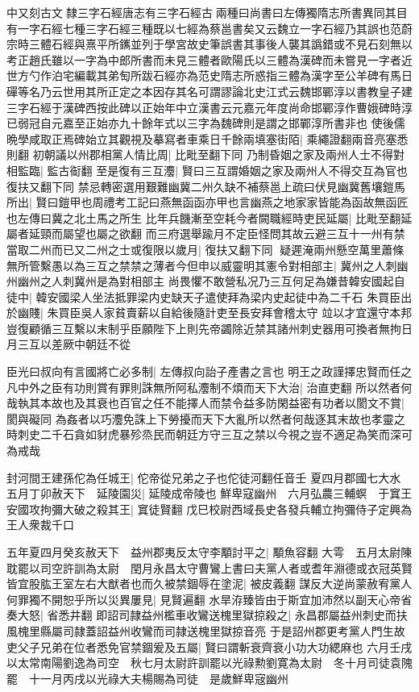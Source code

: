 {中又刻古文隸三字石經唐志有三字石經古兩種曰尚書曰左傳獨隋志所書異同其目有一字石經七種三字石經三種既以七經為蔡邕書矣又云魏立一字石經乃其誤也范蔚宗時三體石經與熹平所䥴並列于學宮故史筆誤書其事後人襲其譌錯或不見石刻無以考正趙氏雖以一字為中郎所書而未見三體者歐陽氏以三體為漢碑而未嘗見一字者近世方勺作泊宅編載其弟匋所跋石經亦為范史隋志所惑指三體為漢字至公羊碑有馬日磾等名乃云世用其所正定之本因存其名可謂謬論北史江式云魏邯鄲淳以書教皇子建三字石經于漢碑西按此碑以正始年中立漢書云元嘉元年度尚命邯鄲淳作曹娥碑時淳已弱冠自元嘉至正始亦九十餘年式以三字為魏碑則是謂之邯鄲淳所書非也}
使後儒晩學咸取正焉碑始立其觀視及摹寫者車乘日千餘兩填塞街陌|{
	乘繩證翻兩音亮塞悉則翻}
初朝議以州郡相黨人情比周|{
	比毗至翻下同}
乃制昏姻之家及兩州人士不得對相監臨|{
	監古䘖翻}
至是復有三互灋|{
	賢曰三互謂婚姻之家及兩州人不得交互為官也復扶又翻下同}
禁忌轉密選用艱難幽冀二州久缺不補蔡邕上疏曰伏見幽冀舊壤鎧馬所出|{
	賢曰鎧甲也周禮考工記曰燕無函函亦甲也言幽燕之地家家皆能為函故無函匠也左傳曰冀之北土馬之所生}
比年兵饑漸至空耗今者闕職經時吏民延屬|{
	比毗至翻延屬者延頸而屬望也屬之欲翻}
而三府選舉踰月不定臣怪問其故云避三互十一州有禁當取二州而已又二州之士或復限以歲月|{
	復扶又翻下同}
疑遲淹兩州懸空萬里蕭條無所管繫愚以為三互之禁禁之薄者今但申以威靈明其憲令對相部主|{
	冀州之人刺幽州幽州之人刺冀州是為對相部主}
尚畏懼不敢營私况乃三互何足為嫌昔韓安國起自徒中|{
	韓安國梁人坐法抵罪梁内史缺天子遣使拜為梁内史起徒中為二千石}
朱買臣出於幽賤|{
	朱買臣吳人家貧賣薪以自給後隨計吏至長安拜會稽太守}
竝以才宜還守本邦豈復顧循三互繫以末制乎臣願陛下上則先帝蠲除近禁其諸州刺史器用可換者無拘日月三互以差厥中朝廷不從

臣光曰叔向有言國將亡必多制|{
	左傳叔向詒子產書之言也}
明王之政謹擇忠賢而任之凡中外之臣有功則賞有罪則誅無所阿私灋制不煩而天下大治|{
	治直吏翻}
所以然者何哉執其本故也及其衰也百官之任不能擇人而禁令益多防閑益密有功者以閡文不賞|{
	閡與礙同}
為姦者以巧灋免誅上下勞擾而天下大亂所以然者何哉逐其末故也孝靈之時刺史二千石貪如豺虎暴殄烝民而朝廷方守三互之禁以今視之豈不適足為笑而深可為戒哉

封河間王建孫佗為任城王|{
	佗帝從兄弟之子也佗徒河翻任音壬}
夏四月郡國七大水　五月丁卯赦天下　延陵園災|{
	延陵成帝陵也}
鮮卑寇幽州　六月弘農三輔螟　于窴王安國攻拘彌大破之殺其王|{
	窴徒賢翻}
戊巳校尉西域長史各發兵輔立拘彌侍子定興為王人衆裁千口

五年夏四月癸亥赦天下　益州郡夷反太守李顒討平之|{
	顒魚容翻}
大雩　五月太尉陳耽罷以司空許訓為太尉　閏月永昌太守曹鸞上書曰夫黨人者或耆年淵德或衣冠英賢皆宜股肱王室左右大猷者也而久被禁錮辱在塗泥|{
	被皮義翻}
謀反大逆尚蒙赦宥黨人何罪獨不開恕乎所以災異屢見|{
	見賢遍翻}
水旱洊臻皆由于斯宜加沛然以副天心帝省奏大怒|{
	省悉井翻}
即詔司隷益州檻車收鸞送槐里獄掠殺之|{
	永昌郡屬益州刺史而扶風槐里縣屬司隷蓋詔益州收鸞而司隷送槐里獄掠音亮}
于是詔州郡更考黨人門生故吏父子兄弟在位者悉免官禁錮爰及五屬|{
	賢曰謂斬衰齊衰小功大功緦麻也}
六月壬戌以太常南陽劉逸為司空　秋七月太尉許訓罷以光祿勲劉寛為太尉　冬十月司徒袁隗罷　十一月丙戌以光祿大夫楊賜為司徒　是歲鮮卑宼幽州

